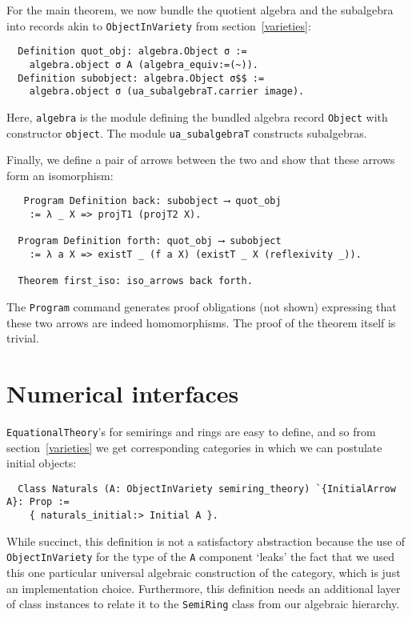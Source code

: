 \documentclass[a4paper,10pt,runningheads]{llncs}
\begin{document}
For the main theorem, we now bundle the quotient algebra and the subalgebra into records akin to \lstinline|ObjectInVariety| from section~\ref{varieties}:
\begin{lstlisting}
  Definition quot_obj: algebra.Object σ :=
    algebra.object σ A (algebra_equiv:=(~)).
  Definition subobject: algebra.Object σ$$ :=
    algebra.object σ (ua_subalgebraT.carrier image).
\end{lstlisting}
Here, \lstinline|algebra| is the module defining the bundled algebra record \lstinline|Object| with constructor \lstinline|object|. The module \lstinline|ua_subalgebraT| constructs subalgebras.

Finally, we define a pair of arrows between the two and show that these arrows form an isomorphism:
\begin{lstlisting}
   Program Definition back: subobject ⟶ quot_obj
    := λ _ X => projT1 (projT2 X).

  Program Definition forth: quot_obj ⟶ subobject
    := λ a X => existT _ (f a X) (existT _ X (reflexivity _)).

  Theorem first_iso: iso_arrows back forth.
\end{lstlisting}
The \lstinline|Program| command generates proof obligations (not shown) expressing that these two arrows are indeed homomorphisms. The proof of the theorem itself is trivial.

\section{Numerical interfaces}\label{numbers}

\lstinline|EquationalTheory|'s for semirings and rings are easy to define, and so from section~\ref{varieties} we get corresponding categories in which we can postulate initial objects:
\begin{lstlisting}
  Class Naturals (A: ObjectInVariety semiring_theory) `{InitialArrow A}: Prop :=
    { naturals_initial:> Initial A }.
\end{lstlisting}
While succinct, this definition is not a satisfactory abstraction because the use of \lstinline|ObjectInVariety| for the type of the \lstinline|A| component `leaks' the fact that we used this one particular universal algebraic construction of the category, which is just an implementation choice. Furthermore, this definition needs an additional layer of class instances to relate it to the \lstinline|SemiRing| class from our algebraic hierarchy.
\end{document}
